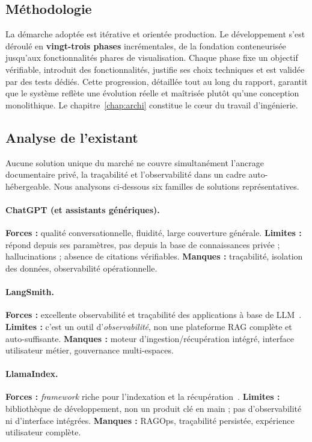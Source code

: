\subsection{Méthodologie}
La démarche adoptée est itérative et orientée production. Le développement s'est
déroulé en \textbf{vingt-trois phases} incrémentales, de la fondation
conteneurisée jusqu'aux fonctionnalités phares de visualisation. Chaque phase fixe
un objectif vérifiable, introduit des fonctionnalités, justifie ses choix
techniques et est validée par des tests dédiés. Cette progression, détaillée tout
au long du rapport, garantit que le système reflète une évolution réelle et
maîtrisée plutôt qu'une conception monolithique. Le chapitre~\ref{chap:archi}
constitue le c{\oe}ur du travail d'ingénierie.

\subsection{Analyse de l'existant}
Aucune solution unique du marché ne couvre simultanément l'ancrage documentaire
privé, la traçabilité et l'observabilité dans un cadre auto-hébergeable. Nous
analysons ci-dessous six familles de solutions représentatives.

\paragraph{ChatGPT (et assistants génériques).} \textbf{Forces :} qualité
conversationnelle, fluidité, large couverture générale. \textbf{Limites :} répond
depuis ses paramètres, pas depuis la base de connaissances privée ; hallucinations ;
absence de citations vérifiables. \textbf{Manques :} traçabilité, isolation des
données, observabilité opérationnelle.

\paragraph{LangSmith.} \textbf{Forces :} excellente observabilité et traçabilité
des applications à base de LLM~\cite{langsmith}. \textbf{Limites :} c'est un outil
d'\emph{observabilité}, non une plateforme RAG complète et auto-suffisante.
\textbf{Manques :} moteur d'ingestion/récupération intégré, interface utilisateur
métier, gouvernance multi-espaces.

\paragraph{LlamaIndex.} \textbf{Forces :} \emph{framework} riche pour
l'indexation et la récupération~\cite{llamaindex}. \textbf{Limites :} bibliothèque
de développement, non un produit clé en main ; pas d'observabilité ni d'interface
intégrées. \textbf{Manques :} RAGOps, traçabilité persistée, expérience
utilisateur complète.

